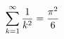 \documentclass[preview]{standalone}
\begin{document}
\begin{align*}
\sum_{k=1}^\infty {1 \over k^2} = {\pi^2 \over 6}
\end{align*}
\end{document}
